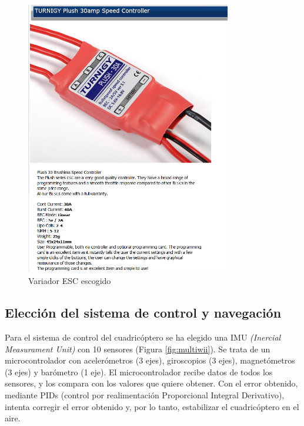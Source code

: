 \documentclass[12pt,twoside]{article}
\begin{document}
\begin{itemize}
				\begin{figure}
					\centering
					\includegraphics[width=0.8\textwidth]{Imatges/Componentes/ESC.png}
					\caption{Variador ESC escogido}
					\label{fig:ESC_nuestro}
			\end{figure}
				
			\end{itemize}
			
	\subsection{Elección del sistema de control y navegación}\label{subsec:control_navegacion}
	
		Para el sistema de control del cuadricóptero se ha elegido una IMU \textit{(Inercial Measurament Unit)} con 10 sensores (Figura \ref{fig:multiwii}). Se trata de un microcontrolador con acelerómetros (3 ejes), giroscopios (3 ejes), magnetómetros (3 ejes) y barómetro (1 eje). El microcontrolador recibe datos de todos los sensores, y los compara con los valores que quiere obtener. Con el error obtenido, mediante PIDs (control por realimentación Proporcional Integral Derivativo), intenta corregir el error obtenido y, por lo tanto, estabilizar el cuadricóptero en el aire.
		
\end{document}
